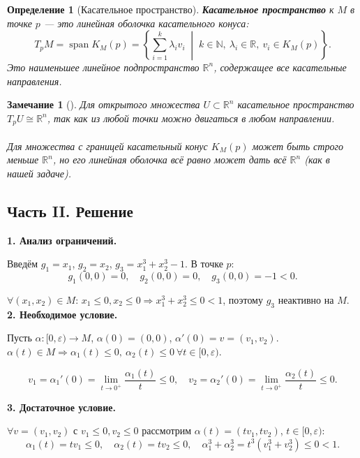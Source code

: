 \documentclass[12pt]{article}
\newtheorem{definition}{Определение}
\newtheorem{remark}{Замечание}
\begin{document}
\begin{definition}[Касательное пространство]
\textbf{Касательное пространство} к $M$ в точке $p$ --- это линейная оболочка касательного конуса:
\[
T_p M = \operatorname{span} K_M(p) = \left\{ \sum_{i=1}^k \lambda_i v_i \;\middle|\; k \in \mathbb{N},\ \lambda_i \in \mathbb{R},\ v_i \in K_M(p) \right\}.
\]
Это наименьшее линейное подпространство $\mathbb{R}^n$, содержащее все касательные направления.
\end{definition}

\begin{remark}[]
Для открытого множества $U \subset \mathbb{R}^n$ касательное пространство $T_p U \cong \mathbb{R}^n$, так как из любой точки можно двигаться в любом направлении.\\
\\
Для множества с границей касательный конус $K_M(p)$ может быть строго меньше $\mathbb{R}^n$, но его линейная оболочка всё равно может дать всё $\mathbb{R}^n$ (как в нашей задаче).
\end{remark}

\newpage
\subsection*{Часть II. Решение}

\textbf{1. Анализ ограничений.\\}

Введём $g_1 = x_1$, $g_2 = x_2$, $g_3 = x_1^3 + x_2^3 - 1$. В точке $p$:
\[
g_1(0,0) = 0, \quad g_2(0,0) = 0, \quad g_3(0,0) = -1 < 0.
\]

$\forall (x_1, x_2) \in M$: $x_1 \le 0, x_2 \le 0 \Rightarrow x_1^3 + x_2^3 \le 0 < 1$, поэтому $g_3$ неактивно на $M$.\\

\textbf{2. Необходимое условие.\\}

Пусть $\alpha: [0, \varepsilon) \to M$, $\alpha(0) = (0,0)$, $\alpha'(0) = v = (v_1, v_2)$.\\

$\alpha(t) \in M \Rightarrow \alpha_1(t) \le 0,\ \alpha_2(t) \le 0\ \forall t \in [0, \varepsilon)$.

\[
v_1 = \alpha_1'(0) = \lim_{t \to 0^+} \frac{\alpha_1(t)}{t} \le 0, \quad v_2 = \alpha_2'(0) = \lim_{t \to 0^+} \frac{\alpha_2(t)}{t} \le 0.
\]

\textbf{3. Достаточное условие.\\}

$\forall v = (v_1, v_2)$ с $v_1 \le 0, v_2 \le 0$ рассмотрим $\alpha(t) = (tv_1, tv_2)$, $t \in [0, \varepsilon)$:
\[
\alpha_1(t) = tv_1 \le 0, \quad \alpha_2(t) = tv_2 \le 0, \quad \alpha_1^3 + \alpha_2^3 = t^3(v_1^3 + v_2^3) \le 0 < 1.
\]
\end{document}
